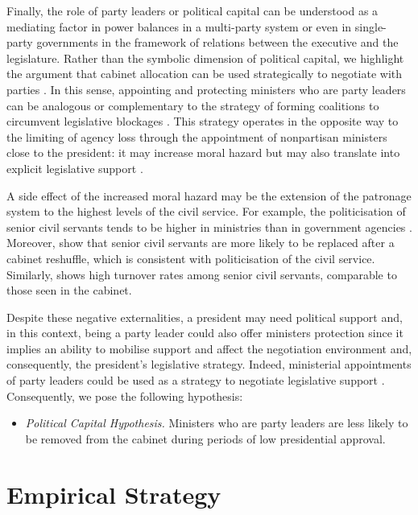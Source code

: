 \documentclass[12pt,halfline,a4paper]{ouparticle}
\begin{document}
Finally, the role of party leaders or political capital can be understood as a mediating factor in power balances in a multi-party system or even in single-party governments in the framework of relations between the executive and the legislature. Rather than the symbolic dimension of political capital, we highlight the argument that cabinet allocation can be used strategically to negotiate with parties \citep{Schleiter2020}. In this sense, appointing and protecting ministers who are party leaders can be analogous or complementary to the strategy of forming coalitions to circumvent legislative blockages \citep{AmorimNeto2006, MartinezGallardo2012}. This strategy operates in the opposite way to the limiting of agency loss through the appointment of nonpartisan ministers close to the president: it may increase moral hazard but may also translate into explicit legislative support \citep{Altman2000, AmorimNeto2006}.

A side effect of the increased moral hazard may be the extension of the patronage system to the highest levels of the civil service. For example, the politicisation of senior civil servants tends to be higher in ministries than in government agencies \citep{Bach2020}. Moreover, \cite{Staronova2021} show that senior civil servants are more likely to be replaced after a cabinet reshuffle, which is consistent with politicisation of the civil service. Similarly, \cite{GonzalezBustamante2020} shows high turnover rates among senior civil servants, comparable to those seen in the cabinet.

Despite these negative externalities, a president may need political support and, in this context, being a party leader could also offer ministers protection since it implies an ability to mobilise support and affect the negotiation environment and, consequently, the president’s legislative strategy. Indeed, ministerial appointments of party leaders could be used as a strategy to negotiate legislative support \citep{Schleiter2020}. Consequently, we pose the following hypothesis:

\begin{itemize}
\item{{\itshape Political Capital Hypothesis.} Ministers who are party leaders are less likely to be removed from the cabinet during periods of low presidential approval.}
\end{itemize}

\section{Empirical Strategy}
\label{sec3}
\end{document}

